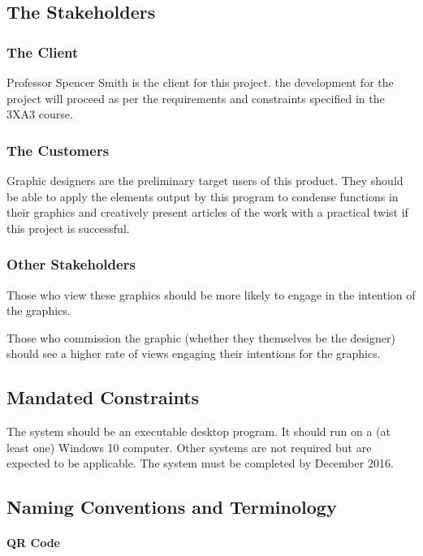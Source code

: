 \documentclass[12pt, titlepage]{article}
\begin{document}
\subsection{The Stakeholders}
	
\subsubsection{The Client}

	Professor Spencer Smith is the client for this project. %
	the development for 
	the project will proceed as per the requirements and constraints specified 
	in the 3XA3 course.

\subsubsection{The Customers}

	Graphic designers are the preliminary target users of this product. 
	They should be able to apply the elements output by this program to 
	condense functions in their graphics and creatively present articles of 
	the work with a practical twist if this project is successful.

\subsubsection{Other Stakeholders}

	Those who view these graphics should be more likely to engage in the 
	intention of the graphics.
	
	Those who commission the graphic (whether they themselves be the 
	designer) should see a higher rate of views engaging their intentions 
	for the graphics.

\subsection{Mandated Constraints}

	The system should be an executable desktop program. It should run on a (at 
	least one) Windows 10 computer. Other systems are not required but are 
	expected to be applicable. The system must be completed by December 2016.

\subsection{Naming Conventions and Terminology}

		\paragraph{QR Code}
		
\end{document}
